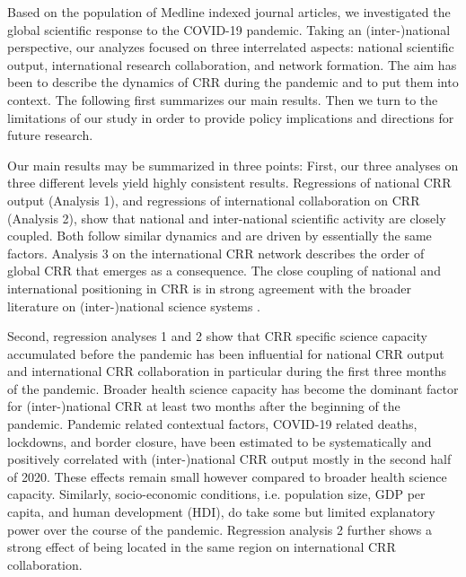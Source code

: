 Based on the population of Medline indexed journal articles, we investigated the global scientific response to the COVID-19 pandemic. Taking an (inter-)national perspective, our analyzes focused on three interrelated aspects: national scientific output, international research collaboration, and network formation. The aim has been to describe the dynamics of CRR during the pandemic and to put them into context. The following first summarizes our main results. Then we turn to the limitations of our study in order to provide policy implications and directions for future research. 

Our main results may be summarized in three points: %
First, our three analyses on three different levels yield highly consistent results. Regressions of national CRR output (Analysis 1), and regressions of international collaboration on CRR (Analysis 2), show that national and inter-national scientific activity are closely coupled. Both follow similar dynamics and are driven by essentially the same factors. Analysis 3 on the international CRR network describes the order of global CRR that emerges as a consequence. The close coupling of national and international positioning in CRR is in strong agreement with the broader literature on (inter-)national science systems \citep[see e.g.][in combination]{adams2013fourth,davidson1977distribution,luukkonen1992understanding,pan2012world,gui2018international}.

Second, regression analyses 1 and 2 show that CRR specific science capacity accumulated before the pandemic has been influential for national CRR output and international CRR collaboration in particular during the first three months of the pandemic. Broader health science capacity has become the dominant factor for (inter-)national CRR at least two months after the beginning of the pandemic. Pandemic related contextual factors, COVID-19 related deaths, lockdowns, and border closure, have been estimated to be systematically and positively correlated with (inter-)national CRR output mostly in the second half of 2020. These effects remain small however compared to broader health science capacity. Similarly, socio-economic conditions, i.e. population size, GDP per capita, and human development (HDI), do take some but limited explanatory power over the course of the pandemic. Regression analysis 2 further shows a strong effect of being located in the same region on international CRR collaboration. 

